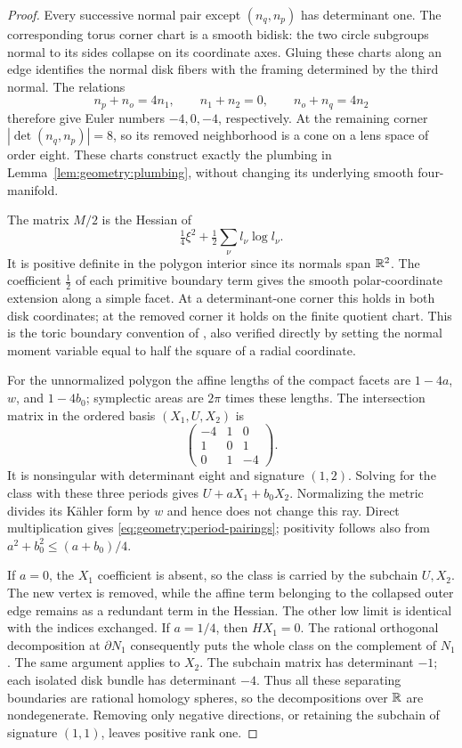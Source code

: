 \begin{proof}
Every successive normal pair except $(n_q,n_p)$ has determinant one.
The corresponding torus corner chart is a smooth bidisk: the two
circle subgroups normal to its sides collapse on its coordinate axes.
Gluing these charts along an edge identifies the normal disk fibers
with the framing determined by the third normal.  The relations
\[
 n_p+n_o=4n_1,\qquad n_1+n_2=0,\qquad n_o+n_q=4n_2
\]
therefore give Euler numbers $-4,0,-4$, respectively.  At the remaining
corner $|\det(n_q,n_p)|=8$, so its removed neighborhood is a cone on
a lens space of order eight.  These charts construct exactly the
plumbing in Lemma~\ref{lem:geometry:plumbing}, without changing its
underlying smooth four-manifold.

The matrix $M/2$ is the Hessian of
\[
 \tfrac14\xi^2+\tfrac12\sum_\nu l_\nu\log l_\nu.
\]
It is positive definite in the polygon interior since its normals
span $\mathbb R^2$.  The coefficient $\tfrac12$ of each primitive boundary
term gives the smooth polar-coordinate extension along a simple
facet.  At a determinant-one corner this holds in both disk
coordinates; at the removed corner it holds on the finite quotient
chart.  This is the toric boundary convention of
\cite{Guillemin1994}, also verified directly by setting the normal
moment variable equal to half the square of a radial coordinate.

For the unnormalized polygon the affine lengths of the compact
facets are $1-4a$, $w$, and $1-4b_0$; symplectic areas are $2\pi$
times these lengths.  The intersection matrix in the ordered basis
$(X_1,U,X_2)$ is
\begin{equation}
 \begin{pmatrix}-4&1&0\\1&0&1\\0&1&-4\end{pmatrix}.
 \label{eq:geometry:plumbing-matrix}
\end{equation}
It is nonsingular with determinant eight and signature $(1,2)$.
Solving for the class with these three periods gives
$U+aX_1+b_0X_2$.  Normalizing the metric divides its K\"ahler form by
$w$ and hence does not change this ray.  Direct multiplication gives
\eqref{eq:geometry:period-pairings}; positivity follows also from
$a^2+b_0^2\le(a+b_0)/4$.

If $a=0$, the $X_1$ coefficient is absent, so the class is carried by
the subchain $U,X_2$.  The new vertex is removed, while the affine
term belonging to the collapsed outer edge remains as a redundant
term in the Hessian.  The other low limit is identical with the
indices exchanged.  If $a=1/4$, then $HX_1=0$.  The rational
orthogonal decomposition at $\partial N_1$ consequently puts the
whole class on the complement of $N_1$.  The same argument applies
to $X_2$.  The subchain matrix has determinant $-1$; each isolated
disk bundle has determinant $-4$.  Thus all these separating
boundaries are rational homology spheres, so the decompositions over
$\mathbb R$ are nondegenerate.  Removing only negative directions, or
retaining the subchain of signature $(1,1)$, leaves positive rank one.
\end{proof}

